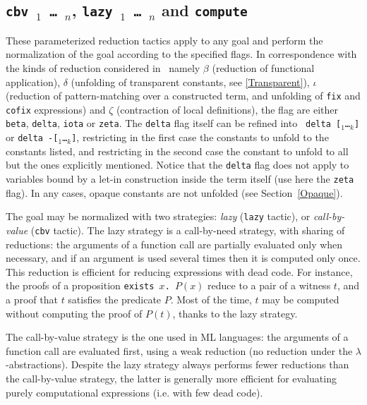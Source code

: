 \begin{coq_example*}

\subsection[{\tt cbv \flag$_1$ \dots\ \flag$_n$}, {\tt lazy \flag$_1$
\dots\ \flag$_n$} and {\tt compute}]
{{\tt cbv \flag$_1$ \dots\ \flag$_n$}, {\tt lazy \flag$_1$
\dots\ \flag$_n$} and {\tt compute}
\label{vmcompute}}

These parameterized reduction tactics apply to any goal and perform
the normalization of the goal according to the specified flags. In
correspondence with the kinds of reduction considered in \Coq\, namely
$\beta$ (reduction of functional application), $\delta$ (unfolding of
transparent constants, see \ref{Transparent}), $\iota$ (reduction of
pattern-matching over a constructed term, and unfolding of {\tt fix}
and {\tt cofix} expressions) and $\zeta$ (contraction of local
definitions), the flag are either {\tt beta}, {\tt delta}, {\tt iota}
or {\tt zeta}. The {\tt delta} flag itself can be refined into {\tt
delta [\qualid$_1$\ldots\qualid$_k$]} or {\tt delta
-[\qualid$_1$\ldots\qualid$_k$]}, restricting in the first case the
constants to unfold to the constants listed, and restricting in the
second case the constant to unfold to all but the ones explicitly
mentioned. Notice that the {\tt delta} flag does not apply to
variables bound by a let-in construction inside the term itself (use
here the {\tt zeta} flag). In any cases, opaque constants are not
unfolded (see Section~\ref{Opaque}).

The goal may be normalized with two strategies: {\em lazy} ({\tt lazy}
tactic), or {\em call-by-value} ({\tt cbv} tactic). The lazy strategy
is a call-by-need strategy, with sharing of reductions: the arguments of a
function call are partially evaluated only when necessary, and if an
argument is used several times then it is computed only once. This
reduction is efficient for reducing expressions with dead code. For
instance, the proofs of a proposition {\tt exists~$x$. $P(x)$} reduce to a
pair of a witness $t$, and a proof that $t$ satisfies the predicate
$P$. Most of the time, $t$ may be computed without computing the proof
of $P(t)$, thanks to the lazy strategy.

The call-by-value strategy is the one used in ML languages: the
arguments of a function call are evaluated first, using a weak
reduction (no reduction under the $\lambda$-abstractions). Despite the
lazy strategy always performs fewer reductions than the call-by-value
strategy, the latter is generally more efficient for evaluating purely
computational expressions (i.e. with few dead code).


\end{coq_example*}
